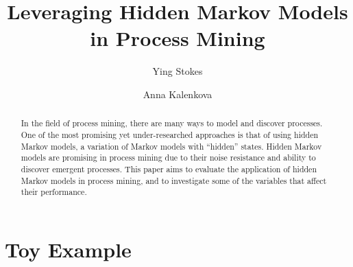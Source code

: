 \documentclass[runningheads]{llncs}
\begin{document}
%
\title{Leveraging Hidden Markov Models in Process Mining}
%
%
\author{Ying Stokes \and Anna Kalenkova}
%
%
%
\maketitle              %
%
\begin{abstract}
  In the field of process mining, there are many ways to model and discover processes. One of the most promising yet under-researched approaches is that of using hidden Markov models, a variation of Markov models with ``hidden'' states. Hidden Markov models are promising in process mining due to their noise resistance and ability to discover emergent processes. This paper aims to evaluate the application of hidden Markov models in process mining, and to investigate some of the variables that affect their performance.
\end{abstract}

\section{Toy Example}
\end{document}
